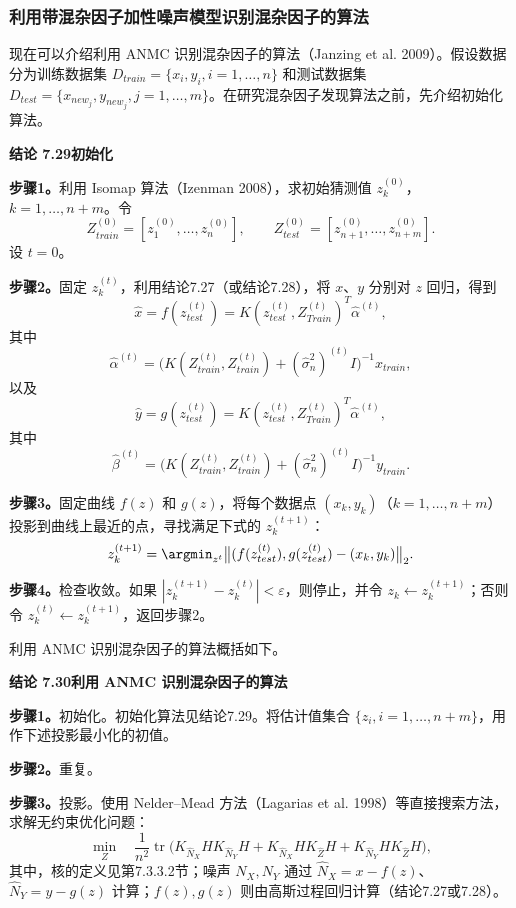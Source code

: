 \subsubsection{利用带混杂因子加性噪声模型识别混杂因子的算法}

现在可以介绍利用 ANMC 识别混杂因子的算法（Janzing et al. 2009）。假设数据分为训练数据集 $D_{train}=\{x_i,y_i,i=1,\ldots,n\}$ 和测试数据集 $D_{test}=\{x_{new_j},y_{new_j},j=1,\ldots,m\}$。在研究混杂因子发现算法之前，先介绍初始化算法。

\noindent\textbf{结论 7.29\quad 初始化}

\noindent\textbf{步骤1。}利用 Isomap 算法（Izenman 2008），求初始猜测值 $z_k^{(0)}$，$k=1,\ldots,n+m$。令
\[
Z_{train}^{(0)}=[z_1^{(0)},\ldots,z_n^{(0)}],\qquad
Z_{test}^{(0)}=[z_{n+1}^{(0)},\ldots,z_{n+m}^{(0)}].
\]
设 $t=0$。

\noindent\textbf{步骤2。}固定 $z_k^{(t)}$，利用结论7.27（或结论7.28），将 $x$、$y$ 分别对 $z$ 回归，得到
\[
\widehat x=f(z_{test}^{(t)})=K(z_{test}^{(t)},Z_{Train}^{(t)})^T\widehat\alpha^{(t)},
\]
其中
\[
\widehat\alpha^{(t)}=\bigl(K(Z_{train}^{(t)},Z_{train}^{(t)})+(\widehat\sigma_n^2)^{(t)}I\bigr)^{-1}x_{train},
\]
以及
\[
\widehat y=g(z_{test}^{(t)})=K(z_{test}^{(t)},Z_{Train}^{(t)})^T\widehat\alpha^{(t)},
\]
其中
\[
\widehat\beta^{(t)}=\bigl(K(Z_{train}^{(t)},Z_{train}^{(t)})+(\widehat\sigma_n^2)^{(t)}I\bigr)^{-1}y_{train}.
\]

\noindent\textbf{步骤3。}固定曲线 $f(z)$ 和 $g(z)$，将每个数据点 $(x_k,y_k)$（$k=1,\ldots,n+m$）投影到曲线上最近的点，寻找满足下式的 $z_k^{(t+1)}$：
\[
z_k^{(t+1)}=\argmin_{z^t}\bigl\|(f(z_{test}^{(t)}),g(z_{test}^{(t)})-(x_k,y_k)\bigr\|_2.
\]

\noindent\textbf{步骤4。}检查收敛。如果 $|z_k^{(t+1)}-z_k^{(t)}|<\varepsilon$，则停止，并令 $z_k\leftarrow z_k^{(t+1)}$；否则令 $z_k^{(t)}\leftarrow z_k^{(t+1)}$，返回步骤2。

利用 ANMC 识别混杂因子的算法概括如下。

\noindent\textbf{结论 7.30\quad 利用 ANMC 识别混杂因子的算法}

\noindent\textbf{步骤1。}初始化。初始化算法见结论7.29。将估计值集合 $\{z_i,i=1,\ldots,n+m\}$，用作下述投影最小化的初值。

\noindent\textbf{步骤2。}重复。

\noindent\textbf{步骤3。}投影。使用 Nelder–Mead 方法（Lagarias et al. 1998）等直接搜索方法，求解无约束优化问题：
\[
\min_Z\quad \frac1{n^2}\operatorname{tr}\bigl(
K_{\widehat N_X}HK_{\widehat N_Y}H
+K_{\widehat N_X}HK_{\widehat Z}H
+K_{\widehat N_Y}HK_{\widehat Z}H\bigr),
\]
其中，核的定义见第7.3.3.2节；噪声 $N_X,N_Y$ 通过 $\widehat N_X=x-f(z)$、$\widehat N_Y=y-g(z)$ 计算；$f(z),g(z)$ 则由高斯过程回归计算（结论7.27或7.28）。

